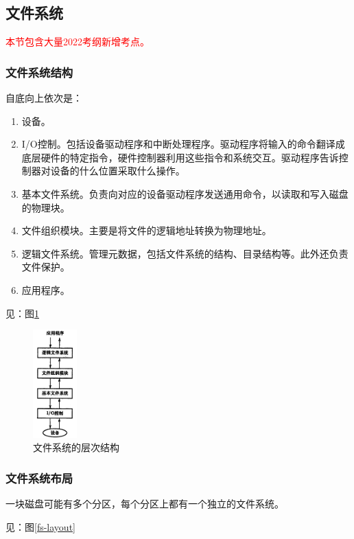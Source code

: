 \documentclass[12pt, a4paper, oneside]{ctexart}
\begin{document}
\subsection{文件系统}

\textcolor{red}{本节包含大量2022考纲新增考点。}

\subsubsection{文件系统结构}

自底向上依次是：
\begin{enumerate}
  \item 设备。
  \item I/O控制。包括设备驱动程序和中断处理程序。驱动程序将输入的命令翻译成底层硬件的特定指令，硬件控制器利用这些指令和系统交互。驱动程序告诉控制器对设备的什么位置采取什么操作。
  \item 基本文件系统。负责向对应的设备驱动程序发送通用命令，以读取和写入磁盘的物理块。
  \item 文件组织模块。主要是将文件的逻辑地址转换为物理地址。
  \item 逻辑文件系统。管理元数据，包括文件系统的结构、目录结构等。此外还负责文件保护。
  \item 应用程序。
\end{enumerate}

见：图\ref{fs-layer}

\begin{figure}
  \centering
  \includegraphics[width=0.15\textwidth]{./images/fs-layer.png}
  \caption{文件系统的层次结构}
  \label{fs-layer}
\end{figure}

\subsubsection{文件系统布局}

一块磁盘可能有多个分区，每个分区上都有一个独立的文件系统。

见：图\ref{fs-layout}
\end{document}
